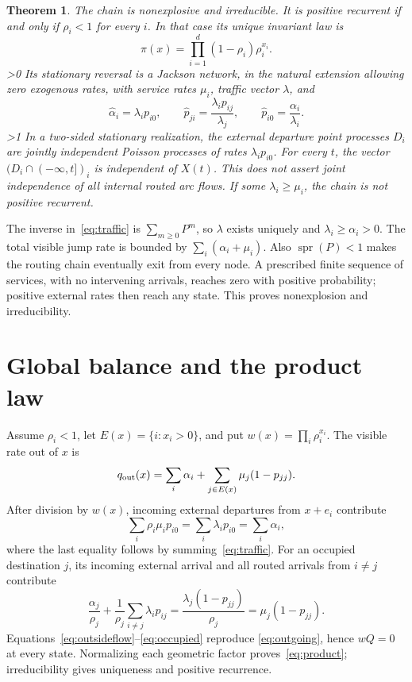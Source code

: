 \documentclass[10pt]{article}
\providecommand{\CRevisionRound}{2}
\newtheorem{theorem}{Theorem}
\newcommand{\spr}{\operatorname{spr}}
\begin{document}
\begin{theorem}\label{thm:main}
The chain is nonexplosive and irreducible. It is positive recurrent if and
only if \(\rho_i<1\) for every \(i\). In that case its unique invariant law is
\begin{equation}\label{eq:product}
 \pi(x)=\prod_{i=1}^d(1-\rho_i)\rho_i^{x_i}.
\end{equation}
\ifnum\CRevisionRound>0
Its stationary reversal is a Jackson network, in the natural extension
allowing zero exogenous rates, with service rates \(\mu_i\), traffic vector
\(\lambda\), and
\begin{equation}\label{eq:reverse}
 \widehat\alpha_i=\lambda_ip_{i0},\qquad
 \widehat p_{ji}=\frac{\lambda_ip_{ij}}{\lambda_j},\qquad
 \widehat p_{i0}=\frac{\alpha_i}{\lambda_i}.
\end{equation}
\fi
\ifnum\CRevisionRound>1
In a two-sided stationary realization, the external departure point processes
\(D_i\) are jointly independent Poisson processes of rates
\(\lambda_ip_{i0}\). For every \(t\), the vector
\((D_i\cap(-\infty,t])_i\) is independent of \(X(t)\). This does not assert
joint independence of all internal routed arc flows. If some
\(\lambda_i\ge\mu_i\), the chain is not positive recurrent.
\fi
\end{theorem}

The inverse in~\eqref{eq:traffic} is
\(\sum_{m\ge0}P^m\), so \(\lambda\) exists uniquely and
\(\lambda_i\ge\alpha_i>0\). The total visible jump rate is bounded by
\(\sum_i(\alpha_i+\mu_i)\). Also \(\spr(P)<1\) makes the routing chain
eventually exit from every node. A prescribed finite sequence of services,
with no intervening arrivals, reaches zero with positive probability; positive
external rates then reach any state. This proves nonexplosion and
irreducibility.

\section{Global balance and the product law}
Assume \(\rho_i<1\), let \(E(x)=\{i:x_i>0\}\), and put
\(w(x)=\prod_i\rho_i^{x_i}\). The visible rate out of \(x\) is
\begin{equation}\label{eq:outgoing}
 q_{\rm out}(x)=\sum_i\alpha_i+
 \sum_{j\in E(x)}\mu_j(1-p_{jj}).
\end{equation}
After division by \(w(x)\), incoming external departures from \(x+e_i\)
contribute
\begin{equation}\label{eq:outsideflow}
 \sum_i\rho_i\mu_ip_{i0}
 =\sum_i\lambda_ip_{i0}=\sum_i\alpha_i,
\end{equation}
where the last equality follows by summing~\eqref{eq:traffic}. For an occupied
destination \(j\), its incoming external arrival and all routed arrivals from
\(i\ne j\) contribute
\begin{equation}\label{eq:occupied}
 \frac{\alpha_j}{\rho_j}
 +\frac1{\rho_j}\sum_{i\ne j}\lambda_ip_{ij}
 =\frac{\lambda_j(1-p_{jj})}{\rho_j}
 =\mu_j(1-p_{jj}).
\end{equation}
Equations~\eqref{eq:outsideflow}--\eqref{eq:occupied} reproduce
\eqref{eq:outgoing}, hence \(wQ=0\) at every state. Normalizing each geometric
factor proves~\eqref{eq:product}; irreducibility gives uniqueness and positive
recurrence.
\end{document}
